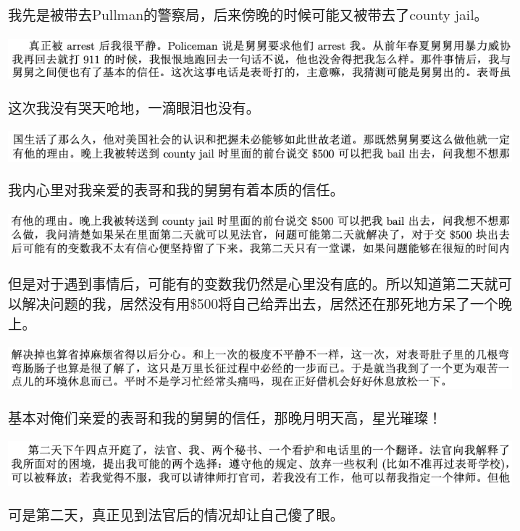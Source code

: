 \documentclass[9pt, b5paper]{article}
\begin{document}
我先是被带去Pullman的警察局，后来傍晚的时候可能又被带去了county jail。

\begin{center}
\includegraphics[width=.9\linewidth]{./pic/backups_plans_20210506_084122.png}
\end{center}

这次我没有哭天呛地，一滴眼泪也没有。 

\begin{center}
\includegraphics[width=.9\linewidth]{./pic/backups_plans_20210506_084228.png}
\end{center}

我内心里对我亲爱的表哥和我的舅舅有着本质的信任。 

\begin{center}
\includegraphics[width=.9\linewidth]{./pic/backups_plans_20210506_084259.png}
\end{center}

但是对于遇到事情后，可能有的变数我仍然是心里没有底的。所以知道第二天就可以解决问题的我，居然没有用\$500将自己给弄出去，居然还在那死地方呆了一个晚上。 

\begin{center}
\includegraphics[width=.9\linewidth]{./pic/backups_plans_20210506_084440.png}
\end{center}

基本对俺们亲爱的表哥和我的舅舅的信任，那晚月明天高，星光璀璨！

\begin{center}
\includegraphics[width=.9\linewidth]{./pic/backups_plans_20210506_084539.png}
\end{center}

可是第二天，真正见到法官后的情况却让自己傻了眼。 
\end{document}
